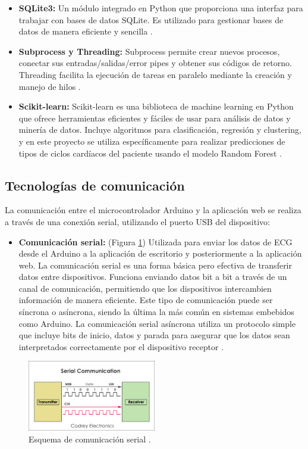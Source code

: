 \begin{itemize}
\item \textbf{SQLite3:} Un módulo integrado en Python que proporciona una interfaz para trabajar con bases de datos SQLite. Es utilizado para gestionar bases de datos de manera eficiente y sencilla \cite{SQLite}.
\item \textbf{Subprocess y Threading:} Subprocess permite crear nuevos procesos, conectar sus entradas/salidas/error pipes y obtener sus códigos de retorno. Threading facilita la ejecución de tareas en paralelo mediante la creación y manejo de hilos \cite{Python}.
\item \textbf{Scikit-learn:} Scikit-learn es una biblioteca de machine learning en Python que ofrece herramientas eficientes y fáciles de usar para análisis de datos y minería de datos. Incluye algoritmos para clasificación, regresión y clustering, y en este proyecto se utiliza específicamente para realizar predicciones de tipos de ciclos cardíacos del paciente usando el modelo Random Forest \cite{ScikitLearn}.
\end{itemize}

\subsection{Tecnologías de comunicación}
La comunicación entre el microcontrolador Arduino y la aplicación web se realiza a través de una conexión serial, utilizando el puerto USB del dispositivo:

\begin{itemize}
\item \textbf{Comunicación serial:} (Figura \ref{fig:serial_communication})
Utilizada para enviar los datos de ECG desde el Arduino a la aplicación de escritorio y posteriormente a la aplicación web. La comunicación serial es una forma básica pero efectiva de transferir datos entre dispositivos. Funciona enviando datos bit a bit a través de un canal de comunicación, permitiendo que los dispositivos intercambien información de manera eficiente. Este tipo de comunicación puede ser síncrona o asíncrona, siendo la última la más común en sistemas embebidos como Arduino. La comunicación serial asíncrona utiliza un protocolo simple que incluye bits de inicio, datos y parada para asegurar que los datos sean interpretados correctamente por el dispositivo receptor \cite{serial_communication_basics}.
\end{itemize}

\begin{figure}[h]
\centering
\includegraphics[width=0.5\textwidth]{img/Serial.png}
\caption{Esquema de comunicación serial \cite{serial_communication_basics}.}
\label{fig:serial_communication}
\end{figure}




